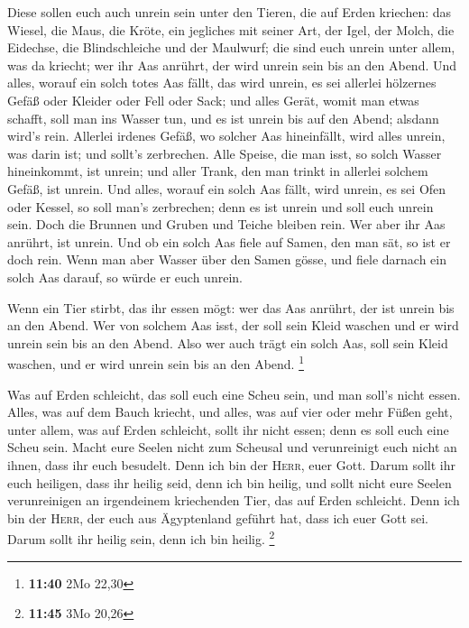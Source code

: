  Diese sollen euch auch unrein sein unter den Tieren, die
auf Erden kriechen: das Wiesel, die Maus, die Kröte, ein jegliches mit
seiner Art,  der Igel, der Molch, die Eidechse, die
Blindschleiche und der Maulwurf;  die sind euch unrein
unter allem, was da kriecht; wer ihr Aas anrührt, der wird unrein sein
bis an den Abend.  Und alles, worauf ein solch totes Aas
fällt, das wird unrein, es sei allerlei hölzernes Gefäß oder Kleider
oder Fell oder Sack; und alles Gerät, womit man etwas schafft, soll man
ins Wasser tun, und es ist unrein bis auf den Abend; alsdann wird's
rein.  Allerlei irdenes Gefäß, wo solcher Aas
hineinfällt, wird alles unrein, was darin ist; und sollt's zerbrechen.
 Alle Speise, die man isst, so solch Wasser hineinkommt,
ist unrein; und aller Trank, den man trinkt in allerlei solchem Gefäß,
ist unrein.  Und alles, worauf ein solch Aas fällt, wird
unrein, es sei Ofen oder Kessel, so soll man's zerbrechen; denn es ist
unrein und soll euch unrein sein.  Doch die Brunnen und
Gruben und Teiche bleiben rein. Wer aber ihr Aas anrührt, ist unrein.
 Und ob ein solch Aas fiele auf Samen, den man sät, so
ist er doch rein.  Wenn man aber Wasser über den Samen
gösse, und fiele darnach ein solch Aas darauf, so würde er euch unrein.

 Wenn ein Tier stirbt, das ihr essen mögt: wer das Aas
anrührt, der ist unrein bis an den Abend.  Wer von
solchem Aas isst, der soll sein Kleid waschen und er wird unrein sein
bis an den Abend. Also wer auch trägt ein solch Aas, soll sein Kleid
waschen, und er wird unrein sein bis an den Abend. \footnote{\textbf{11:40}
  2Mo 22,30}

 Was auf Erden schleicht, das soll euch eine Scheu sein,
und man soll's nicht essen.  Alles, was auf dem Bauch
kriecht, und alles, was auf vier oder mehr Füßen geht, unter allem, was
auf Erden schleicht, sollt ihr nicht essen; denn es soll euch eine Scheu
sein.  Macht eure Seelen nicht zum Scheusal und
verunreinigt euch nicht an ihnen, dass ihr euch besudelt.
 Denn ich bin der \textsc{Herr}, euer Gott. Darum sollt
ihr euch heiligen, dass ihr heilig seid, denn ich bin heilig, und sollt
nicht eure Seelen verunreinigen an irgendeinem kriechenden Tier, das auf
Erden schleicht.  Denn ich bin der \textsc{Herr}, der
euch aus Ägyptenland geführt hat, dass ich euer Gott sei. Darum sollt
ihr heilig sein, denn ich bin heilig. \footnote{\textbf{11:45} 3Mo 20,26}

